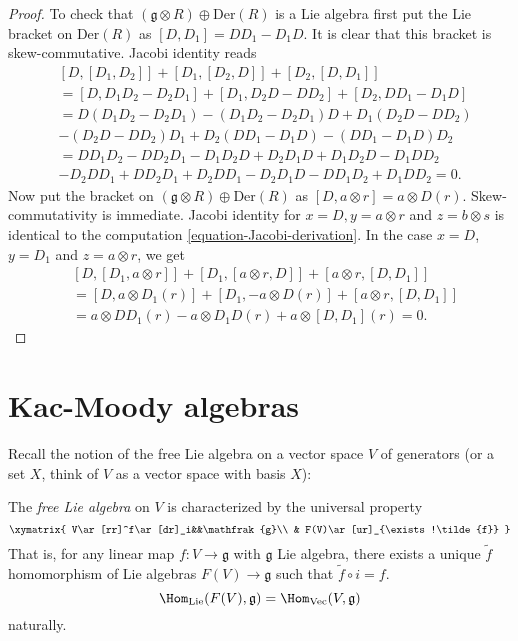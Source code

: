 \begin{proof}
\medskip\noindent
To check that $(\mathfrak{g}\otimes R)\oplus\text{Der}(R)$ is a Lie algebra 
first put the Lie bracket on $\text{Der}(R)$ as
$[D,D_1]=DD_1-D_1D$. It is clear that this bracket is skew-commutative. 
Jacobi identity reads
\begin{align*}
&[D,[D_1,D_2]]+[D_1,[D_2,D]]+[D_2,[D,D_1]]\\
&=[D,D_1D_2-D_2D_1]+[D_1,D_2D-DD_2]+[D_2,DD_1-D_1D]\\
&=D(D_1D_2-D_2D_1)-(D_1D_2-D_2D_1)D+D_1(D_2D-DD_2)\\
&-(D_2D-DD_2)D_1+D_2(DD_1-D_1D)-(DD_1-D_1D)D_2\\
&=DD_1D_2-DD_2D_1-D_1D_2D+D_2D_1D+D_1D_2D-D_1DD_2\\
&-D_2DD_1+DD_2D_1+D_2DD_1-D_2D_1D-DD_1D_2+D_1DD_2=0.
\end{align*}
Now put the bracket on $(\mathfrak{g} \otimes  R)\oplus\text{Der}(R)$ as
$[D,a \otimes  r]=a \otimes D(r)$. Skew-commutativity is immediate. 
Jacobi identity for $x=D,y=a\otimes r$ and $z=b\otimes s$ is identical to the
computation \ref{equation-Jacobi-derivation}. In the case
$x=D$, $y=D_1$ and $z=a\otimes r$, we get
\begin{align*}
&[D,[D_1,a\otimes r]]+[D_1,[a\otimes r,D]]+[a\otimes r,[D,D_1]]\\
&=[D,a\otimes D_1(r)]+[D_1,-a\otimes D(r)]+[a\otimes r,[D,D_1]]\\
&=a\otimes DD_1(r)-a\otimes D_1D(r)+a\otimes [D,D_1](r)=0.
\end{align*}

\end{proof}

\section{Kac-Moody algebras}
\label{section-Kac-Moody-algebras}

Recall the notion of the free Lie algebra on a 
vector space $V$ of generators 
(or a set $X$, think of $V$ as a vector space with basis $X$):

\begin{definition}
\label{definition-free-Lie-algebra}
The {\it free Lie algebra} on $V$ is characterized by the universal property
$$
\xymatrix{
V\ar[rr]^f\ar[dr]_i&&\mathfrak{g}\\
& F(V)\ar[ur]_{\exists !\tilde{f}}
}
$$
That is, for any linear map $f:V \to \mathfrak{g}$ with $\mathfrak{g}$ Lie
algebra, there exists a unique $\tilde{f}$ homomorphism of Lie algebras 
$F(V)\to \mathfrak{g}$ such that $\tilde{f} \circ i=f$.
$$
\Hom_{\text{Lie}}(F(V),\mathfrak{g})=\Hom_{\text{Vec}}(V,\mathfrak{g})
$$
naturally.
\end{definition}

